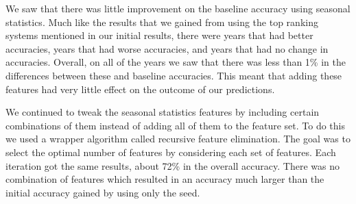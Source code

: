 We saw that there was little improvement on the baseline accuracy using seasonal statistics. 
Much like the results that we gained from using the top ranking systems mentioned in our initial results, there were years that had better accuracies, years that had worse accuracies, and years that had no change in accuracies. 
Overall, on all of the years we saw that there was less than 1\% in the differences between these and baseline accuracies. 
This meant that adding these features had very little effect on the outcome of our predictions. 

We continued to tweak the seasonal statistics features by including certain combinations of them instead of adding all of them to the feature set. 
To do this we used a wrapper algorithm called recursive feature elimination. 
The goal was to select the optimal number of features by considering each set of features. 
Each iteration got the same results, about 72\% in the overall accuracy. 
There was no combination of features which resulted in an accuracy much larger than the initial accuracy gained by using only the seed.

